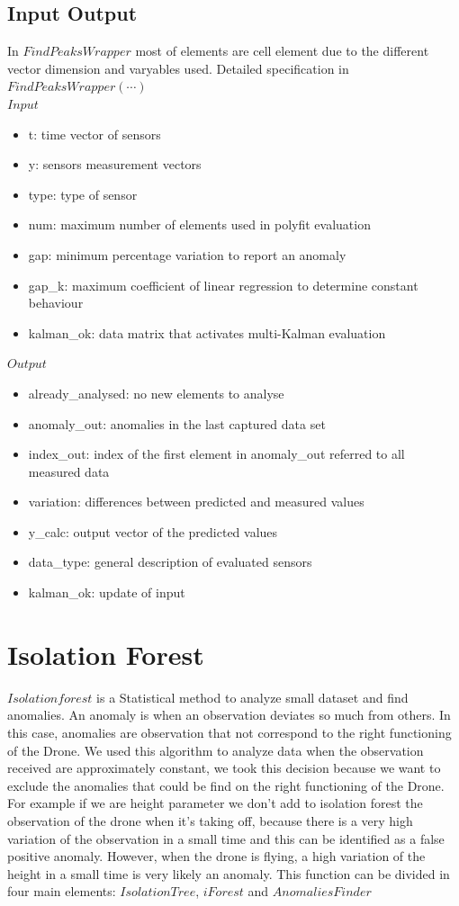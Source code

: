 \documentclass[journal]{IEEEtran}
\begin{document}
\subsection{Input \- Output}
In \(FindPeaksWrapper\) most of elements are cell{} element due to the different vector dimension and varyables used.
Detailed specification in \(FindPeaksWrapper(\cdots)\)
\\
\(Input\)
\begin{itemize}
\item t: time vector of sensors
\item y: sensors measurement vectors
\item type: type of sensor 
\item num: maximum number of elements used in polyfit evaluation
\item gap: minimum percentage variation to report an anomaly
\item gap\_k: maximum coefficient of linear regression to determine constant behaviour
\item kalman\_ok: data matrix that activates multi-Kalman evaluation
\end{itemize}


\(Output\)
\begin{itemize}
\item already\_analysed: no new elements to analyse
\item anomaly\_out: anomalies in the last captured data set
\item index\_out: index of the first element in anomaly\_out referred to all measured data
\item variation: differences between predicted and measured values
\item y\_calc: output vector of the predicted values
\item data\_type: general description of evaluated sensors
\item kalman\_ok: update of input
\end{itemize}


\section{Isolation Forest}
\(Isolation forest\) is a Statistical method to analyze small dataset and find anomalies. An anomaly is when an observation deviates so much from others.  In this case, anomalies are observation that not correspond to the right functioning of the Drone. We used this algorithm to analyze data when the observation received are approximately constant, we took this decision because we want to exclude the anomalies that could be find on the right functioning of the Drone. For example if we are height parameter we don’t add to isolation forest the observation of the drone when it’s  taking off, because there is a very high variation of the observation in a small time and this can be identified as a false positive anomaly. However, when the drone is flying, a high variation of the height in a small time is very likely an anomaly. 
This function can be divided in four main elements: \(Isolation Tree\), \(iForest\) and \(Anomalies Finder\)
\end{document}
